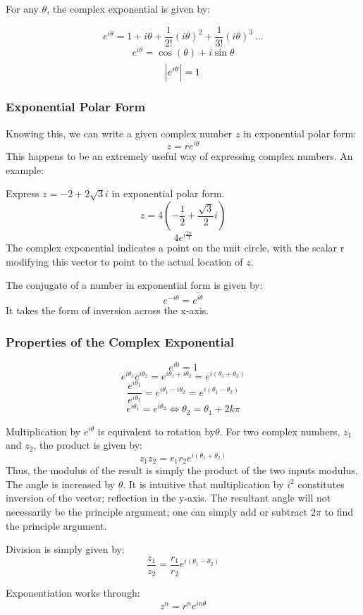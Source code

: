 \documentclass[12pt]{report}
\begin{document}
\begin{flushleft}
For any \(\theta\), the complex exponential is given by:

\[e^{i\theta} = 1 + i\theta + \frac{1}{2!}(i\theta)^2 + \frac{1}{3!}(i\theta)^3 \: ...\]
\[e^{i\theta} = \cos(\theta) + i\sin\theta\]
\[\abs{e^{i\theta}} = 1\]

\subsubsection*{Exponential Polar Form}

Knowing this, we can write a given complex number \(z\) in exponential polar form:
\[z = re^{i\theta}\]
This happens to be an extremely useful way of expressing complex numbers. An example:

\bigskip
Express \(z = -2 + 2\sqrt{3}i\) in exponential polar form.
\[z = 4(-\frac{1}{2} + \frac{\sqrt{3}}{2}i)\]
\[4e^{i\frac{2\pi}{3}}\]
The complex exponential indicates a point on the unit circle, with the scalar r
modifying this vector to point to the actual location of \(z\).

\bigskip
The conjugate of a number in exponential form is given by:
\[e^{-i\theta} = \overline{e^{i\theta}}\]
It takes the form of inversion across the x-axis.

\subsubsection*{Properties of the Complex Exponential}
\[e^{i0} = 1\]
\[e^{i\theta_1}e^{i\theta_2} = e^{i\theta_1+i\theta_2} = e^{i(\theta_1+\theta_2)}\]
\[\frac{e^{i\theta_1}}{e^{i\theta_2}} = e^{i\theta_1 - i\theta_2} = e^{i(\theta_1-\theta_2)}\]
\[e^{i\theta_1} = e^{i\theta_2} \Leftrightarrow \theta_2 = \theta_1 + 2k\pi\]

Multiplication by \(e^{i\theta}\) is equivalent to rotation by\(\theta\). For two complex
numbers, \(z_1\) and \(z_2\), the product is given by:
\[z_1z_2 = r_1r_2e^{i(\theta_1+\theta_2)}\]
Thus, the modulus of the result is simply the product of the two inputs modulus. The
angle is increased by \(\theta\). It is intuitive that multiplication by \(i^2\) constitutes
inversion of the vector; reflection in the y-axis. The resultant angle will not necessarily be
the principle argument; one can simply add or subtract \(2\pi\) to find the principle argument.

\bigskip
Division is simply given by:
\[\frac{z_1}{z_2} = \frac{r_1}{r_2}e^{i(\theta_1-\theta_2)}\]

Exponentiation works through:
\[z^n = r^ne^{in\theta}\]


\end{flushleft}
\end{document}
